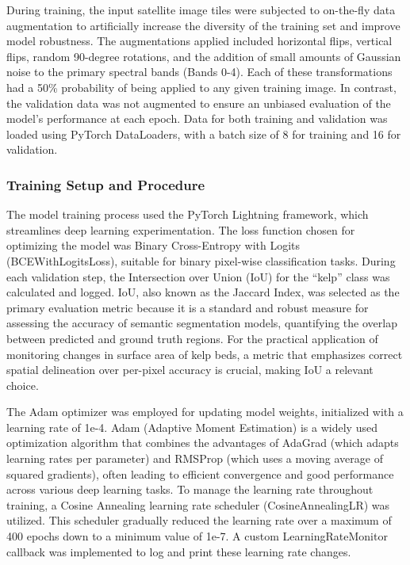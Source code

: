 \documentclass{article}
\begin{document}
During training, the input satellite image tiles were subjected to on-the-fly data augmentation to artificially increase the diversity of the training set and improve model robustness. The augmentations applied included horizontal flips, vertical flips, random 90-degree rotations, and the addition of small amounts of Gaussian noise to the primary spectral bands (Bands 0-4). Each of these transformations had a 50\% probability of being applied to any given training image. In contrast, the validation data was not augmented to ensure an unbiased evaluation of the model's performance at each epoch. Data for both training and validation was loaded using PyTorch DataLoaders, with a batch size of 8 for training and 16 for validation.

\subsubsection{Training Setup and Procedure}

The model training process used the PyTorch Lightning framework, which streamlines deep learning experimentation. The loss function chosen for optimizing the model was Binary Cross-Entropy with Logits (BCEWithLogitsLoss), suitable for binary pixel-wise classification tasks. During each validation step, the Intersection over Union (IoU) for the ``kelp'' class was calculated and logged. IoU, also known as the Jaccard Index, was selected as the primary evaluation metric because it is a standard and robust measure for assessing the accuracy of semantic segmentation models, quantifying the overlap between predicted and ground truth regions. For the practical application of monitoring changes in surface area of kelp beds, a metric that emphasizes correct spatial delineation over per-pixel accuracy is crucial, making IoU a relevant choice.


The Adam optimizer was employed for updating model weights, initialized with a learning rate of 1e-4. Adam (Adaptive Moment Estimation) is a widely used optimization algorithm that combines the advantages of AdaGrad (which adapts learning rates per parameter) and RMSProp (which uses a moving average of squared gradients), often leading to efficient convergence and good performance across various deep learning tasks. To manage the learning rate throughout training, a Cosine Annealing learning rate scheduler (CosineAnnealingLR) was utilized. This scheduler gradually reduced the learning rate over a maximum of 400 epochs down to a minimum value of 1e-7. A custom LearningRateMonitor callback was implemented to log and print these learning rate changes.
\end{document}
